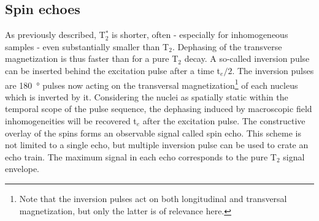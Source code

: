             \subsection{Spin echoes}
            \label{sec:theory:spinEchoes}
            As previously described, T$_2^*$ is shorter, often - especially for inhomogeneous samples - even substantially smaller than T$_2$. Dephasing of the transverse magnetization is thus faster than for a pure T$_2$ decay. A so-called inversion pulse can be inserted  behind the excitation pulse after a time t$_e/2$. The inversion pulses are \SI{180}{\degree} pulses now acting on the transversal magnetization\footnote[1]{Note that the inversion pulses act on both longitudinal and transversal magnetization, but only the latter is of relevance here.} of each nucleus which is inverted by it. Considering the nuclei as spatially static within the temporal scope of the pulse sequence, the dephasing induced by macroscopic field inhomogeneities will be recovered t$_e$ after the excitation pulse. The constructive overlay of the spins forms an observable signal called spin echo.
            This scheme is not limited to a single echo, but multiple inversion pulse can be used to crate an echo train. The maximum signal in each echo corresponds to the pure T$_2$ signal envelope.

